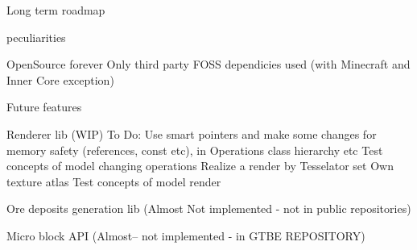 \documentclass[12pt]{article}
\begin{document}
	Long term roadmap

	peculiarities

	OpenSource forever
	Only third party FOSS dependicies used (with Minecraft and Inner Core exception)

	Future features

	Renderer lib (WIP)
	To Do:
		Use smart pointers and make some changes for memory safety (references, const etc), in Operations class hierarchy etc
		Test concepts of model changing operations
		Realize a render by Tesselator
		set Own texture atlas
		Test concepts of model render

	Ore deposits generation lib (Almost Not implemented - not in public repositories)

	Micro block API (Almost-- not implemented - in GTBE REPOSITORY)
\end{document}
